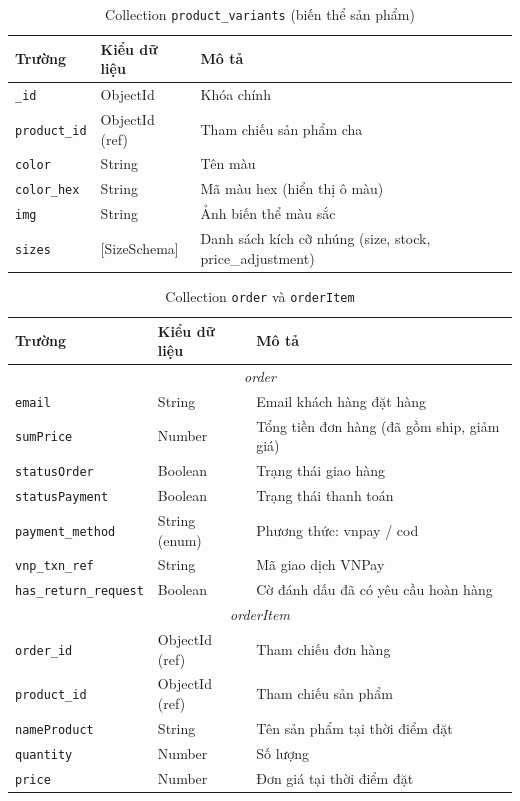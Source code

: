 \documentclass[../DoAn.tex]{subfiles}
\begin{document}
\begin{table}[H]
\centering
\caption{Collection \texttt{product\_variants} (biến thể sản phẩm)}
\label{tab:col-variant}
\scriptsize
\begin{tabular}{|p{3.5cm}|p{3cm}|p{6cm}|}
\hline
\textbf{Trường} & \textbf{Kiểu dữ liệu} & \textbf{Mô tả} \\
\hline
\texttt{\_id} & ObjectId & Khóa chính \\
\hline
\texttt{product\_id} & ObjectId (ref) & Tham chiếu sản phẩm cha \\
\hline
\texttt{color} & String & Tên màu \\
\hline
\texttt{color\_hex} & String & Mã màu hex (hiển thị ô màu) \\
\hline
\texttt{img} & String & Ảnh biến thể màu sắc \\
\hline
\texttt{sizes} & [SizeSchema] & Danh sách kích cỡ nhúng (size, stock, price\_adjustment) \\
\hline
\end{tabular}
\end{table}

\begin{table}[H]
\centering
\caption{Collection \texttt{order} và \texttt{orderItem}}
\label{tab:col-order}
\scriptsize
\begin{tabular}{|p{3.5cm}|p{3cm}|p{6cm}|}
\hline
\textbf{Trường} & \textbf{Kiểu dữ liệu} & \textbf{Mô tả} \\
\hline
\multicolumn{3}{|c|}{\textit{order}} \\
\hline
\texttt{email} & String & Email khách hàng đặt hàng \\
\hline
\texttt{sumPrice} & Number & Tổng tiền đơn hàng (đã gồm ship, giảm giá) \\
\hline
\texttt{statusOrder} & Boolean & Trạng thái giao hàng \\
\hline
\texttt{statusPayment} & Boolean & Trạng thái thanh toán \\
\hline
\texttt{payment\_method} & String (enum) & Phương thức: vnpay / cod \\
\hline
\texttt{vnp\_txn\_ref} & String & Mã giao dịch VNPay \\
\hline
\texttt{has\_return\_request} & Boolean & Cờ đánh dấu đã có yêu cầu hoàn hàng \\
\hline
\multicolumn{3}{|c|}{\textit{orderItem}} \\
\hline
\texttt{order\_id} & ObjectId (ref) & Tham chiếu đơn hàng \\
\hline
\texttt{product\_id} & ObjectId (ref) & Tham chiếu sản phẩm \\
\hline
\texttt{nameProduct} & String & Tên sản phẩm tại thời điểm đặt \\
\hline
\texttt{quantity} & Number & Số lượng \\
\hline
\texttt{price} & Number & Đơn giá tại thời điểm đặt \\
\hline
\end{tabular}
\end{table}
\end{document}
